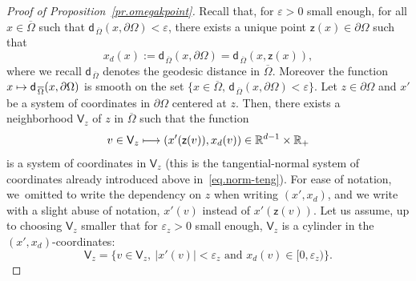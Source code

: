 \documentclass[10pt]{amsart}
\newcommand\mto{\mathchoice{\longmapsto}{\mapsto}{\mapsto}{\mapsto}}
\let\ve\varepsilon
\theoremstyle{plain}
\theoremstyle{definition}
\begin{document}
\begin{proof}[Proof of Proposition~\ref{pr.omegakpoint}]
Recall that, for $\ve>0$ small enough, for all $x\in \overline \Omega$ such that $\mathsf d_{\, \overline \Omega}(x,\partial \Omega)<\ve$, there exists a unique
point $\mathsf z(x)\in \partial \Omega$ such that
\begin{equation}\label{eq.coordxdd}
x_d(x):=\mathsf d_{\, \overline \Omega}(x,\partial \Omega)=\mathsf d_{\, \overline \Omega}(x,\mathsf z(x)),
\end{equation}
where we recall $\mathsf d_{\, \overline \Omega}$ denotes the
geodesic distance in $\overline \Omega$. Moreover the function
$x\mto \mathsf d_{\, \overline \Omega}(x,\partial \Omega)$ is
smooth on the set $\{x\in \overline \Omega,\, \mathsf d_{\, \overline
\Omega}(x,\partial \Omega)<\ve\}$.
Let $z\in \partial \Omega$ and $x'$ be a system of coordinates in $\partial \Omega$ centered at $z$. Then, there exists a neighborhood $\mathsf V_z$ of $z$ in $\overline \Omega$ such that the function
\begin{equation}\label{eq.coord1}
v\in \mathsf V_z\mto (x'(\mathsf z(v)),x_d(v))\in \mathbb R^{d-1}\times \mathbb R_+
\end{equation}
is a system of coordinates in $\mathsf V_z$ (this is the
tangential-normal system of coordinates already introduced above in~\eqref{eq.norm-teng}). For ease of notation, we~omitted to write the dependency on $z$ when writing $(x',x_d)$, and we write with a slight abuse of notation, $x'(v)$ instead of $x'(\mathsf z(v))$.
Let us assume, up to choosing $\mathsf V_z$ smaller that for $\ve_z>0$ small enough, $\mathsf V_z$ is a cylinder in the $(x',x_d)$-coordinates:
\begin{equation}\label{eq.uz}
\mathsf V_z=\big \{v\in \mathsf V_z, \ \vert x'(v)\vert < \ve_z \text{ and } x_d(v)\in [0,\ve_z)\big \}.
\end{equation}


\end{proof}
\end{document}
